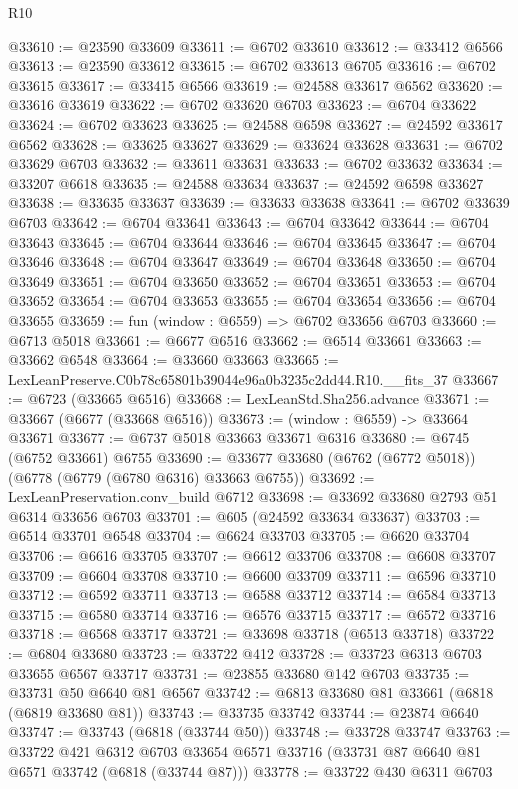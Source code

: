 \begin{lexlean}{R10}
\begin{coremodule}
@33610 := @23590 @33609
@33611 := @6702 @33610
@33612 := @33412 @6566
@33613 := @23590 @33612
@33615 := @6702 @33613 @6705
@33616 := @6702 @33615
@33617 := @33415 @6566
@33619 := @24588 @33617 @6562
@33620 := @33616 @33619
@33622 := @6702 @33620 @6703
@33623 := @6704 @33622
@33624 := @6702 @33623
@33625 := @24588 @6598
@33627 := @24592 @33617 @6562
@33628 := @33625 @33627
@33629 := @33624 @33628
@33631 := @6702 @33629 @6703
@33632 := @33611 @33631
@33633 := @6702 @33632
@33634 := @33207 @6618
@33635 := @24588 @33634
@33637 := @24592 @6598 @33627
@33638 := @33635 @33637
@33639 := @33633 @33638
@33641 := @6702 @33639 @6703
@33642 := @6704 @33641
@33643 := @6704 @33642
@33644 := @6704 @33643
@33645 := @6704 @33644
@33646 := @6704 @33645
@33647 := @6704 @33646
@33648 := @6704 @33647
@33649 := @6704 @33648
@33650 := @6704 @33649
@33651 := @6704 @33650
@33652 := @6704 @33651
@33653 := @6704 @33652
@33654 := @6704 @33653
@33655 := @6704 @33654
@33656 := @6704 @33655
@33659 := fun (window : @6559) => @6702 @33656 @6703
@33660 := @6713 @5018
@33661 := @6677 @6516
@33662 := @6514 @33661
@33663 := @33662 @6548
@33664 := @33660 @33663
@33665 := LexLeanPreserve.C0b78c65801b39044e96a0b3235c2dd44.R10.__fits_37
@33667 := @6723 (@33665 @6516)
@33668 := LexLeanStd.Sha256.advance
@33671 := @33667 (@6677 (@33668 @6516))
@33673 := (window : @6559) -> @33664 @33671
@33677 := @6737 @5018 @33663 @33671 @6316
@33680 := @6745 (@6752 @33661) @6755
@33690 := @33677 @33680 (@6762 (@6772 @5018)) (@6778 (@6779 (@6780 @6316) @33663 @6755))
@33692 := LexLeanPreservation.conv_build @6712
@33698 := @33692 @33680 @2793 @51 @6314 @33656 @6703
@33701 := @605 (@24592 @33634 @33637)
@33703 := @6514 @33701 @6548
@33704 := @6624 @33703
@33705 := @6620 @33704
@33706 := @6616 @33705
@33707 := @6612 @33706
@33708 := @6608 @33707
@33709 := @6604 @33708
@33710 := @6600 @33709
@33711 := @6596 @33710
@33712 := @6592 @33711
@33713 := @6588 @33712
@33714 := @6584 @33713
@33715 := @6580 @33714
@33716 := @6576 @33715
@33717 := @6572 @33716
@33718 := @6568 @33717
@33721 := @33698 @33718 (@6513 @33718)
@33722 := @6804 @33680
@33723 := @33722 @412
@33728 := @33723 @6313 @6703 @33655 @6567 @33717
@33731 := @23855 @33680 @142 @6703
@33735 := @33731 @50 @6640 @81 @6567
@33742 := @6813 @33680 @81 @33661 (@6818 (@6819 @33680 @81))
@33743 := @33735 @33742
@33744 := @23874 @6640
@33747 := @33743 (@6818 (@33744 @50))
@33748 := @33728 @33747
@33763 := @33722
    @421
    @6312
    @6703
    @33654
    @6571
    @33716
    (@33731 @87 @6640 @81 @6571 @33742 (@6818 (@33744 @87)))
@33778 := @33722
    @430
    @6311
    @6703

\end{coremodule}
\end{lexlean}
